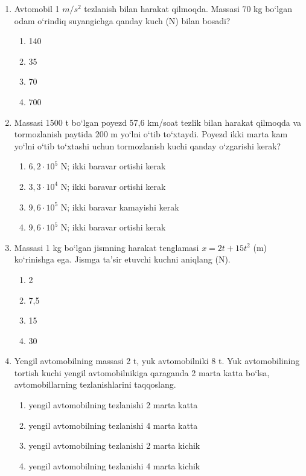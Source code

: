 \begin{enumerate}
\item Avtomobil 1 $m/s^2$ tezlanish bilan harakat qilmoqda. Massasi 70 kg bo‘lgan odam o‘rindiq suyangichga qanday kuch (N) bilan bosadi?
\begin{enumerate}[label=\Alph*)]
\item 140
\item 35
\item 70
\item 700
\end{enumerate}

\item Massasi 1500 t bo‘lgan poyezd 57,6 km/soat tezlik bilan harakat qilmoqda va tormozlanish paytida 200 m yo‘lni o‘tib to‘xtaydi. Poyezd ikki marta kam yo‘lni o‘tib to‘xtashi uchun tormozlanish kuchi qanday o‘zgarishi kerak?
\begin{enumerate}[label=\Alph*)]
\item $6,2 \cdot 10^5$ N; ikki baravar ortishi kerak
\item $3,3 \cdot 10^4$ N; ikki baravar ortishi kerak
\item $9,6 \cdot 10^5$ N; ikki baravar kamayishi kerak
\item $9,6 \cdot 10^5$ N; ikki baravar ortishi kerak
\end{enumerate}

\item Massasi 1 kg bo‘lgan jismning harakat tenglamasi $x = 2t + 15t^2$ (m) ko‘rinishga ega. Jismga ta’sir etuvchi kuchni aniqlang (N).
\begin{enumerate}[label=\Alph*)]
\item 2
\item 7,5
\item 15
\item 30
\end{enumerate}

\item Yengil avtomobilning massasi 2 t, yuk avtomobilniki 8 t. Yuk avtomobilining tortish kuchi yengil avtomobilnikiga qaraganda 2 marta katta bo‘lsa, avtomobillarning tezlanishlarini taqqoslang.
\begin{enumerate}[label=\Alph*)]
\item yengil avtomobilning tezlanishi 2 marta katta
\item yengil avtomobilning tezlanishi 4 marta katta
\item yengil avtomobilning tezlanishi 2 marta kichik
\item yengil avtomobilning tezlanishi 4 marta kichik
\end{enumerate}


\end{enumerate}
